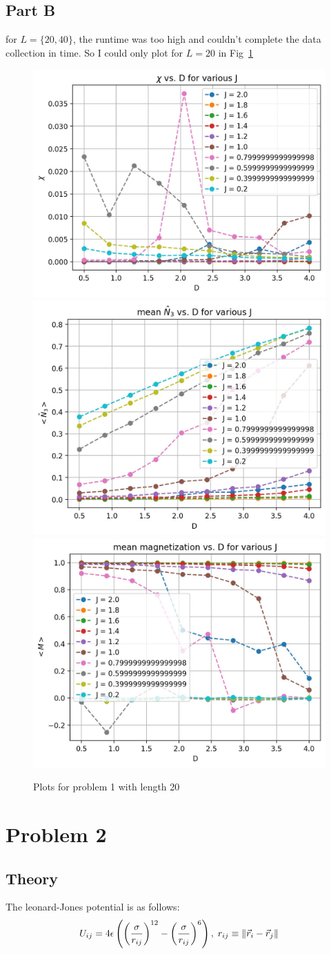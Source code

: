\documentclass[12pt, a4paper]{article}
\begin{document}
	\subsection{Part B}
	for $L = \{20, 40\}$, the runtime was too high and couldn't complete the data collection in time. So I could only plot for $L = 20$
	in Fig~\ref{fig:20}
	\begin{figure}[h!]
		\centering
		\includegraphics[width=.5\linewidth]{../p1/results/chi_20.jpg}
		\includegraphics[width=.5\linewidth]{../p1/results/mean_n3_20.jpg}
		\includegraphics[width=.5\linewidth]{../p1/results/magnetization_20.jpg}
		\caption{Plots for problem 1 with length 20}
		\label{fig:20}
	\end{figure}
	\section{Problem 2}
	\subsection{Theory}
	The leonard-Jones potential is as follows:
		\begin{equation}
		U_{ij} = 4\epsilon \left(\left(\frac{\sigma}{r_{ij}}\right)^{12} - 
		\left(\frac{\sigma}{r_{ij}}\right)^6\right), \; 
		r_{ij} \equiv \norm{\vec{r}_i - \vec{r}_j}
		\label{eq:leonard_jones}
	\end{equation}
	
\end{document}
